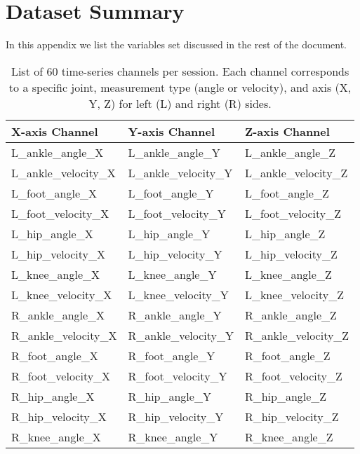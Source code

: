 \chapter{Dataset Summary}\label{chap:appendix-1-datasets}

In this appendix we list the variables set discussed in the rest of the document.

\begin{table}[htbp]
    \centering
    \caption[List of 60 time-series channels]{List of 60 time-series channels per session. Each channel corresponds to a specific joint, measurement type (angle or velocity), and axis (X, Y, Z) for left (L) and right (R) sides. \label{tab:met-ts-vars}}
    \begin{tabular}{lll}
    \hline
    \textbf{X-axis Channel} & \textbf{Y-axis Channel} & \textbf{Z-axis Channel} \\
    \hline
    L\_ankle\_angle\_X      & L\_ankle\_angle\_Y      & L\_ankle\_angle\_Z \\
    L\_ankle\_velocity\_X   & L\_ankle\_velocity\_Y   & L\_ankle\_velocity\_Z \\
    L\_foot\_angle\_X       & L\_foot\_angle\_Y       & L\_foot\_angle\_Z \\
    L\_foot\_velocity\_X    & L\_foot\_velocity\_Y    & L\_foot\_velocity\_Z \\
    L\_hip\_angle\_X        & L\_hip\_angle\_Y        & L\_hip\_angle\_Z \\
    L\_hip\_velocity\_X     & L\_hip\_velocity\_Y     & L\_hip\_velocity\_Z \\
    L\_knee\_angle\_X       & L\_knee\_angle\_Y       & L\_knee\_angle\_Z \\
    L\_knee\_velocity\_X    & L\_knee\_velocity\_Y    & L\_knee\_velocity\_Z \\
    R\_ankle\_angle\_X      & R\_ankle\_angle\_Y      & R\_ankle\_angle\_Z \\
    R\_ankle\_velocity\_X   & R\_ankle\_velocity\_Y   & R\_ankle\_velocity\_Z \\
    R\_foot\_angle\_X       & R\_foot\_angle\_Y       & R\_foot\_angle\_Z \\
    R\_foot\_velocity\_X    & R\_foot\_velocity\_Y    & R\_foot\_velocity\_Z \\
    R\_hip\_angle\_X        & R\_hip\_angle\_Y        & R\_hip\_angle\_Z \\
    R\_hip\_velocity\_X     & R\_hip\_velocity\_Y     & R\_hip\_velocity\_Z \\
    R\_knee\_angle\_X       & R\_knee\_angle\_Y       & R\_knee\_angle\_Z \\

\end{tabular}
\end{table}
